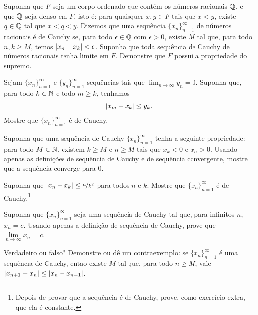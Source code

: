 \begin{exercise}[Desafiador]
Suponha que $F$ seja um corpo ordenado que contém os números racionais
${\mathbb{Q}}$, e que ${\mathbb{Q}}$ seja denso em $F$,
isto é: para quaisquer $x,y \in F$ tais que $x < y$,
existe $q \in {\mathbb{Q}}$ tal que $x < q < y$.
Dizemos que uma sequência $\{ x_n \}_{n=1}^\infty$ de números racionais é de Cauchy
se, para todo $\epsilon \in {\mathbb{Q}}$ com $\epsilon > 0$, existe
$M$ tal que, para todo $n,k \geq M$, temos $\lvert {x_n-x_k} \rvert < \epsilon$.
Suponha que toda sequência de Cauchy de números racionais tenha limite em $F$.
Demonstre que $F$ possui a \hyperref[defn:lub]{propriedade do supremo}.
\end{exercise}

\begin{exercise}
Sejam $\{ x_n \}_{n=1}^\infty$ e $\{ y_n \}_{n=1}^\infty$ sequências tais
que $\lim_{n\to\infty} y_n =0$. Suponha que, para todo $k \in {\mathbb{N}}$
e todo $m \geq k$, tenhamos
\begin{equation*}
\lvert {x_m-x_k} \rvert \leq y_k .
\end{equation*}
Mostre que $\{ x_n \}_{n=1}^\infty$ é de Cauchy.
\end{exercise}

\begin{exercise}
Suponha que uma sequência de Cauchy $\{ x_n \}_{n=1}^\infty$ tenha a seguinte propriedade: para todo $M \in {\mathbb{N}}$,
existem $k \geq M$ e $n \geq M$ tais que
$x_k < 0$ e $x_n > 0$. Usando apenas as definições de sequência de Cauchy
e de sequência convergente, mostre que
a sequência converge para $0$.
\end{exercise}

\begin{exercise}
Suponha que $\lvert {x_n-x_k} \rvert \leq \nicefrac{n}{k^2}$ para todos $n$ e $k$.
Mostre que $\{ x_n \}_{n=1}^\infty$ é de Cauchy.\footnote{Depois de provar que
a sequência é de Cauchy, prove, como exercício extra, que ela é constante.}
\end{exercise}

\begin{exercise}
Suponha que $\{ x_n \}_{n=1}^\infty$ seja uma sequência de Cauchy tal que, para infinitos
$n$, $x_n = c$. Usando apenas a definição de sequência de Cauchy, prove
que $\lim\limits_{n\to\infty} x_n = c$.
\end{exercise}

\begin{exercise}
Verdadeiro ou falso? Demonstre ou dê um contraexemplo: se $\{ x_n \}_{n=1}^\infty$ é uma sequência de Cauchy,
então existe $M$
tal que, para todo $n \geq M$, vale
$\lvert {x_{n+1}-x_n} \rvert
\leq
\lvert {x_{n}-x_{n-1}} \rvert$.
\end{exercise}

